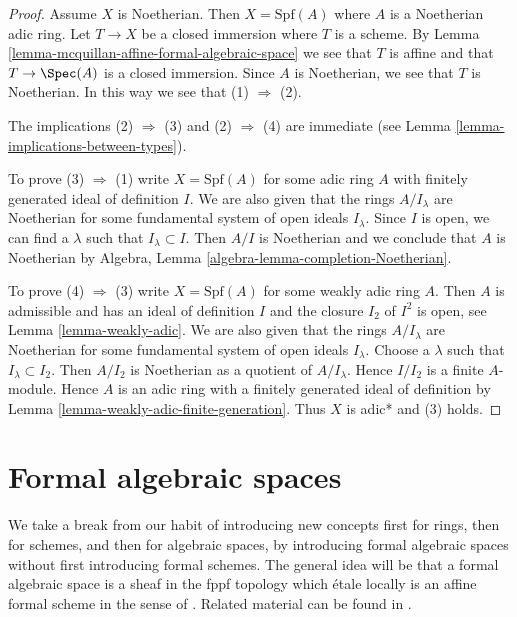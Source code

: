 \begin{proof}
Assume $X$ is Noetherian. Then $X = \text{Spf}(A)$ where
$A$ is a Noetherian adic ring.
Let $T \to X$ be a closed immersion where $T$ is a scheme.
By Lemma \ref{lemma-mcquillan-affine-formal-algebraic-space}
we see that $T$ is affine and that $T \to \Spec(A)$ is a closed
immersion. Since $A$ is Noetherian, we see that $T$ is Noetherian.
In this way we see that (1) $\Rightarrow$ (2).

\medskip\noindent
The implications (2) $\Rightarrow$ (3) and (2) $\Rightarrow$ (4) are
immediate (see Lemma \ref{lemma-implications-between-types}).

\medskip\noindent
To prove (3) $\Rightarrow$ (1) write $X = \text{Spf}(A)$
for some adic ring $A$ with finitely generated ideal of definition $I$.
We are also given that the rings $A/I_\lambda$ are Noetherian
for some fundamental system of open ideals $I_\lambda$.
Since $I$ is open, we can find a $\lambda$ such that $I_\lambda \subset I$.
Then $A/I$ is Noetherian and we conclude that $A$ is Noetherian by
Algebra, Lemma \ref{algebra-lemma-completion-Noetherian}.

\medskip\noindent
To prove (4) $\Rightarrow$ (3) write $X = \text{Spf}(A)$
for some weakly adic ring $A$. Then $A$ is admissible and
has an ideal of definition $I$ and the closure $I_2$ of $I^2$
is open, see Lemma \ref{lemma-weakly-adic}.
We are also given that the rings $A/I_\lambda$ are Noetherian
for some fundamental system of open ideals $I_\lambda$.
Choose a $\lambda$ such that $I_\lambda \subset I_2$.
Then $A/I_2$ is Noetherian as a quotient of $A/I_\lambda$.
Hence $I/I_2$ is a finite $A$-module.
Hence $A$ is an adic ring with a finitely generated ideal
of definition by Lemma \ref{lemma-weakly-adic-finite-generation}.
Thus $X$ is adic* and (3) holds.
\end{proof}





\section{Formal algebraic spaces}
\label{section-formal-algebraic-spaces}

\noindent
We take a break from our habit of introducing new concepts first
for rings, then for schemes, and then for algebraic spaces, by
introducing formal algebraic spaces without first introducing
formal schemes. The general idea will be that a formal algebraic space
is a sheaf in the fppf topology which \'etale locally is an
affine formal scheme in the sense of \cite{BVGD}.
Related material can be found in \cite{Yasuda}.

